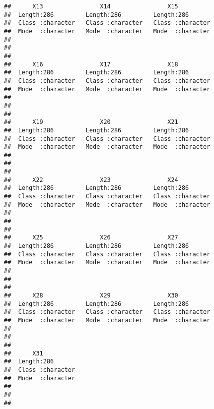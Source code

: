\documentclass[]{article}
\begin{document}
\begin{verbatim}
##      X13                X14                X15           
##  Length:286         Length:286         Length:286        
##  Class :character   Class :character   Class :character  
##  Mode  :character   Mode  :character   Mode  :character  
##                                                          
##                                                          
##                                                          
##      X16                X17                X18           
##  Length:286         Length:286         Length:286        
##  Class :character   Class :character   Class :character  
##  Mode  :character   Mode  :character   Mode  :character  
##                                                          
##                                                          
##                                                          
##      X19                X20                X21           
##  Length:286         Length:286         Length:286        
##  Class :character   Class :character   Class :character  
##  Mode  :character   Mode  :character   Mode  :character  
##                                                          
##                                                          
##                                                          
##      X22                X23                X24           
##  Length:286         Length:286         Length:286        
##  Class :character   Class :character   Class :character  
##  Mode  :character   Mode  :character   Mode  :character  
##                                                          
##                                                          
##                                                          
##      X25                X26                X27           
##  Length:286         Length:286         Length:286        
##  Class :character   Class :character   Class :character  
##  Mode  :character   Mode  :character   Mode  :character  
##                                                          
##                                                          
##                                                          
##      X28                X29                X30           
##  Length:286         Length:286         Length:286        
##  Class :character   Class :character   Class :character  
##  Mode  :character   Mode  :character   Mode  :character  
##                                                          
##                                                          
##                                                          
##      X31           
##  Length:286        
##  Class :character  
##  Mode  :character  
##                    
##                    
## 
\end{verbatim}
\end{document}
